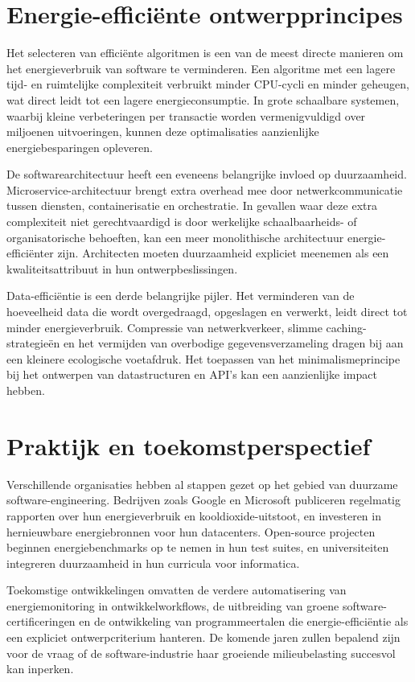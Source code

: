 \documentclass[
    language=dutch,
    doctype=article,
]{../../omnilatex}
\begin{document}
\section{Energie-efficiënte ontwerpprincipes}
Het selecteren van efficiënte algoritmen is een van de meest directe manieren om het energieverbruik van software te verminderen. Een algoritme met een lagere tijd- en ruimtelijke complexiteit verbruikt minder CPU-cycli en minder geheugen, wat direct leidt tot een lagere energieconsumptie. In grote schaalbare systemen, waarbij kleine verbeteringen per transactie worden vermenigvuldigd over miljoenen uitvoeringen, kunnen deze optimalisaties aanzienlijke energiebesparingen opleveren.

De softwarearchitectuur heeft een eveneens belangrijke invloed op duurzaamheid. Microservice-architectuur brengt extra overhead mee door netwerkcommunicatie tussen diensten, containerisatie en orchestratie. In gevallen waar deze extra complexiteit niet gerechtvaardigd is door werkelijke schaalbaarheids- of organisatorische behoeften, kan een meer monolithische architectuur energie-efficiënter zijn. Architecten moeten duurzaamheid expliciet meenemen als een kwaliteitsattribuut in hun ontwerpbeslissingen.

Data-efficiëntie is een derde belangrijke pijler. Het verminderen van de hoeveelheid data die wordt overgedraagd, opgeslagen en verwerkt, leidt direct tot minder energieverbruik. Compressie van netwerkverkeer, slimme caching-strategieën en het vermijden van overbodige gegevensverzameling dragen bij aan een kleinere ecologische voetafdruk. Het toepassen van het minimalismeprincipe bij het ontwerpen van datastructuren en API's kan een aanzienlijke impact hebben.

\section{Praktijk en toekomstperspectief}
Verschillende organisaties hebben al stappen gezet op het gebied van duurzame software-engineering. Bedrijven zoals Google en Microsoft publiceren regelmatig rapporten over hun energieverbruik en kooldioxide-uitstoot, en investeren in hernieuwbare energiebronnen voor hun datacenters. Open-source projecten beginnen energiebenchmarks op te nemen in hun test suites, en universiteiten integreren duurzaamheid in hun curricula voor informatica.

Toekomstige ontwikkelingen omvatten de verdere automatisering van energiemonitoring in ontwikkelworkflows, de uitbreiding van groene software-certificeringen en de ontwikkeling van programmeertalen die energie-efficiëntie als een expliciet ontwerpcriterium hanteren. De komende jaren zullen bepalend zijn voor de vraag of de software-industrie haar groeiende milieubelasting succesvol kan inperken.
\end{document}
